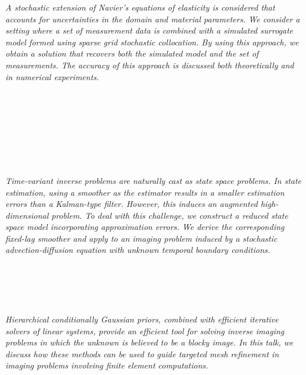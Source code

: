   \begin{multicols}{2}
    \textit{A stochastic extension of Navier's equations of elasticity is considered that accounts for uncertainties in the domain and material parameters. We consider a setting where a set of measurement data is combined with a simulated surrogate model formed using sparse grid stochastic collocation. By using this approach, we obtain a solution that recovers both the simulated model and the set of measurements. The accuracy of this approach is discussed both theoretically and in numerical experiments.}\\
\\ 
      \\
      \\\\
      \\
      \\\\
\\
    \textit{Time-variant inverse problems are naturally cast as state space problems. In state estimation, using a smoother as the estimator results in a smaller estimation errors than a Kalman-type filter. However, this induces an augmented high-dimensional problem. To deal with this challenge, we construct a reduced state space model incorporating approximation errors. We derive the corresponding fixed-lag smoother and apply to an imaging problem induced by a stochastic advection-diffusion equation with unknown temporal boundary conditions.}\\
\\ 
      \\
      \\\\
\\
    \textit{Hierarchical conditionally Gaussian priors, combined with efficient iterative solvers of linear systems, provide an efficient tool for solving inverse imaging problems in which the unknown is believed to be a blocky image. In this talk, we discuss how these methods can be used to guide targeted mesh refinement in imaging problems involving finite element computations.}\\
\\ 
      \\
      \\\\

\end{multicols}
